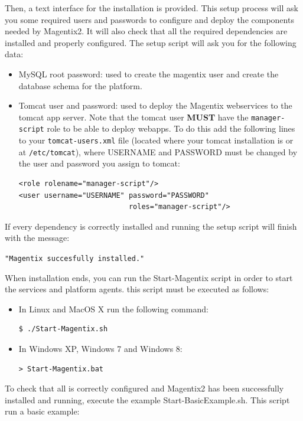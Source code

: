 Then, a text interface for the installation is provided. This setup process will ask you some required users and passwords to configure and deploy the components needed by Magentix2. It will also check that all the required dependencies are installed and properly configured. The setup script will ask you for the following data:
\begin{itemize}
    \item MySQL root password: used to create the magentix user and create the database schema for the platform.
    \item Tomcat user and password: used to deploy the Magentix webservices to the tomcat app server. Note that the tomcat user \textbf{MUST} have the \texttt{manager-script} role to be able to deploy webapps. To do this add the following lines to your \texttt{tomcat-users.xml} file (located where your tomcat installation is or at \texttt{/etc/tomcat}), where USERNAME and PASSWORD must be changed by the user and password you assign to tomcat:
    \begin{verbatim}
<role rolename="manager-script"/>
<user username="USERNAME" password="PASSWORD" 
                          roles="manager-script"/>
    \end{verbatim}
    
\end{itemize}

If every dependency is correctly installed and running the setup script will finish with the message: 
\begin{center}
\texttt{"Magentix succesfully installed."}
\end{center}

When installation ends, you can run the Start-Magentix script in order to start the services and platform agents. this script must be executed as follows:

\begin{itemize}
    \item In Linux and MacOS X run the following command:
\begin{verbatim}
$ ./Start-Magentix.sh
\end{verbatim}
    \item In Windows XP, Windows 7 and Windows 8:
\begin{verbatim}
> Start-Magentix.bat
\end{verbatim}
\end{itemize}

To check that all is correctly configured and Magentix2 has been successfully installed and running, execute the example Start-BasicExample.sh.
This script run a basic example:


